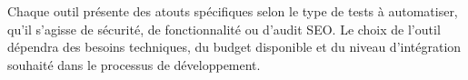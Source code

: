 \begin{justify}
\begin{spacing}{1.5}
\begin{longtable}{|p{2.7cm}|p{6.6cm}|p{6.6cm}|}
\begin{minipage}[t]{6.6cm}
                        \end{minipage}\\
                        \hline
                    \end{longtable}
        \end{spacing}
        \vspace{-0.4cm}
        Chaque outil présente des atouts spécifiques selon le type de tests à automatiser, qu’il s’agisse de sécurité, de fonctionnalité ou d’audit SEO. Le choix de l’outil dépendra des besoins techniques, du budget disponible et du niveau d’intégration souhaité dans le processus de développement.
\end{justify}